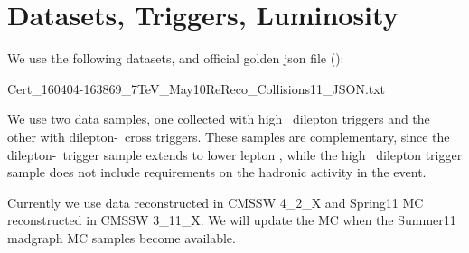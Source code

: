 \section{Datasets, Triggers, Luminosity}
\label{sec:datasets}

We use the following datasets, and official golden json file (\lumi):

Cert\_160404-163869\_7TeV\_May10ReReco\_Collisions11\_JSON.txt

We use two data samples, one collected with high \pt\ dilepton triggers and the other 
with dilepton-\Ht\ cross triggers. These samples are complementary, since the dilepton-\Ht\
trigger sample extends to lower lepton \pt, while the high \pt\ dilepton trigger sample 
does not include requirements on the hadronic activity in the event. 

Currently we use data reconstructed in CMSSW 4\_2\_X and Spring11 MC reconstructed in CMSSW 3\_11\_X.
We will update the MC  when the Summer11 madgraph MC samples become available.

